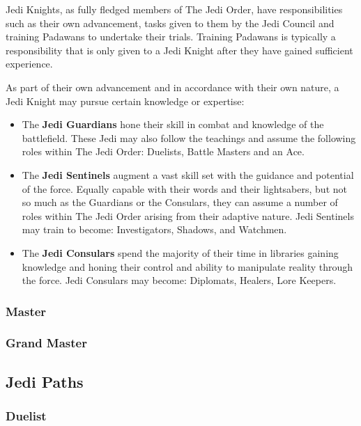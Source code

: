 \documentclass[a4paper,10pt,final,twocolumn,oneside]{book}
\begin{document}
Jedi Knights, as fully fledged members of The Jedi Order, have responsibilities such as their own advancement, tasks given to them by the Jedi Council and training Padawans to undertake their trials. Training Padawans is typically a responsibility that is only given to a Jedi Knight after they have gained sufficient experience.

As part of their own advancement and in accordance with their own nature, a Jedi Knight may pursue certain knowledge or expertise:

\begin{itemize}
\item The \textbf{Jedi Guardians} hone their skill in combat and knowledge of the battlefield. These Jedi may also follow the teachings and assume the following roles within The Jedi Order: Duelists, Battle Masters and an Ace.
\item The \textbf{Jedi Sentinels} augment a vast skill set with the guidance and potential of the force. Equally capable with their words and their lightsabers, but not so much as the Guardians or the Consulars, they can assume a number of roles within The Jedi Order arising from their adaptive nature. Jedi Sentinels may train to become: Investigators, Shadows, and Watchmen.
\item The \textbf{Jedi Consulars} spend the majority of their time in libraries gaining knowledge and honing their control and ability to manipulate reality through the force. Jedi Consulars may become: Diplomats, Healers, Lore Keepers.
\end{itemize}

\subsubsection{Master}

\subsubsection{Grand Master}


\subsection{Jedi Paths} %
\label{sub:jedi_paths}

\subsubsection{Duelist}
\end{document}
